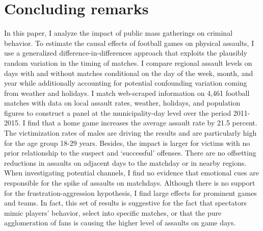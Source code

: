 









\bigskip
\section{Concluding remarks}\label{sec_soc_ext:conclusion}

In this paper, I analyze the impact of public mass gatherings on criminal behavior. To estimate the causal effects of football games on physical assaults, I use a generalized difference-in-differences approach that exploits the plausibly random variation in the timing of matches. I compare regional assault levels on days with and without matches conditional on the day of the week, month, and year while additionally accounting for potential confounding variation coming from weather and holidays. I match web-scraped information on 4,461 football matches with data on local assault rates, weather, holidays, and population figures to construct a panel at the municipality-day level over the period 2011-2015. I find that a home game increases the average assault rate by 21.5 percent. The victimization rates of males are driving the results and are particularly high for the age group 18-29 years. Besides, the impact is 
larger for victims with no prior relationship to the suspect and `successful' offenses. There are no offsetting reductions in assaults on adjacent days to the matchday or in nearby regions. When investigating potential channels, I find no evidence that emotional cues are responsible for the spike of assaults on matchdays. Although there is no support for the frustration-aggression hypothesis, I find large effects for prominent games and teams. In fact, this set of results is suggestive for the fact that spectators mimic players' behavior, select into specific matches, or that the pure agglomeration of fans is causing the higher level of assaults on game days. 




